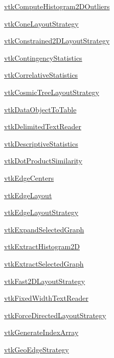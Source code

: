 \begin{DoxyItemize}
\item \hyperlink{vtkinfovis_vtkcomputehistogram2doutliers}{vtk\-Compute\-Histogram2\-D\-Outliers}  
\item \hyperlink{vtkinfovis_vtkconelayoutstrategy}{vtk\-Cone\-Layout\-Strategy}  
\item \hyperlink{vtkinfovis_vtkconstrained2dlayoutstrategy}{vtk\-Constrained2\-D\-Layout\-Strategy}  
\item \hyperlink{vtkinfovis_vtkcontingencystatistics}{vtk\-Contingency\-Statistics}  
\item \hyperlink{vtkinfovis_vtkcorrelativestatistics}{vtk\-Correlative\-Statistics}  
\item \hyperlink{vtkinfovis_vtkcosmictreelayoutstrategy}{vtk\-Cosmic\-Tree\-Layout\-Strategy}  
\item \hyperlink{vtkinfovis_vtkdataobjecttotable}{vtk\-Data\-Object\-To\-Table}  
\item \hyperlink{vtkinfovis_vtkdelimitedtextreader}{vtk\-Delimited\-Text\-Reader}  
\item \hyperlink{vtkinfovis_vtkdescriptivestatistics}{vtk\-Descriptive\-Statistics}  
\item \hyperlink{vtkinfovis_vtkdotproductsimilarity}{vtk\-Dot\-Product\-Similarity}  
\item \hyperlink{vtkinfovis_vtkedgecenters}{vtk\-Edge\-Centers}  
\item \hyperlink{vtkinfovis_vtkedgelayout}{vtk\-Edge\-Layout}  
\item \hyperlink{vtkinfovis_vtkedgelayoutstrategy}{vtk\-Edge\-Layout\-Strategy}  
\item \hyperlink{vtkinfovis_vtkexpandselectedgraph}{vtk\-Expand\-Selected\-Graph}  
\item \hyperlink{vtkinfovis_vtkextracthistogram2d}{vtk\-Extract\-Histogram2\-D}  
\item \hyperlink{vtkinfovis_vtkextractselectedgraph}{vtk\-Extract\-Selected\-Graph}  
\item \hyperlink{vtkinfovis_vtkfast2dlayoutstrategy}{vtk\-Fast2\-D\-Layout\-Strategy}  
\item \hyperlink{vtkinfovis_vtkfixedwidthtextreader}{vtk\-Fixed\-Width\-Text\-Reader}  
\item \hyperlink{vtkinfovis_vtkforcedirectedlayoutstrategy}{vtk\-Force\-Directed\-Layout\-Strategy}  
\item \hyperlink{vtkinfovis_vtkgenerateindexarray}{vtk\-Generate\-Index\-Array}  
\item \hyperlink{vtkinfovis_vtkgeoedgestrategy}{vtk\-Geo\-Edge\-Strategy}  

\end{DoxyItemize}
